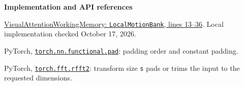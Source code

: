 \documentclass[11pt]{article}
\begin{document}
\vspace{3pt}
{\small\textbf{Implementation and API references}\par
[1] \href{https://github.com/jomorg1724/VisualAttentionWorkingMemory/blob/a65838909ee2e7ac169b1f37fc982a2f493c36ed/SecondPass/StabilizedAttentionKrauzlis/model.py#L13-L36}{VisualAttentionWorkingMemory: \texttt{LocalMotionBank}, lines 13--36}. Local implementation checked October 17, 2026.\par
[2] PyTorch, \href{https://docs.pytorch.org/docs/2.14/generated/torch.nn.functional.pad.html}{\texttt{torch.nn.functional.pad}}: padding order and constant padding.\par
[3] PyTorch, \href{https://docs.pytorch.org/docs/2.14/generated/torch.fft.rfft2.html}{\texttt{torch.fft.rfft2}}: transform size \texttt{s} pads or trims the input to the requested dimensions.}
\end{document}
